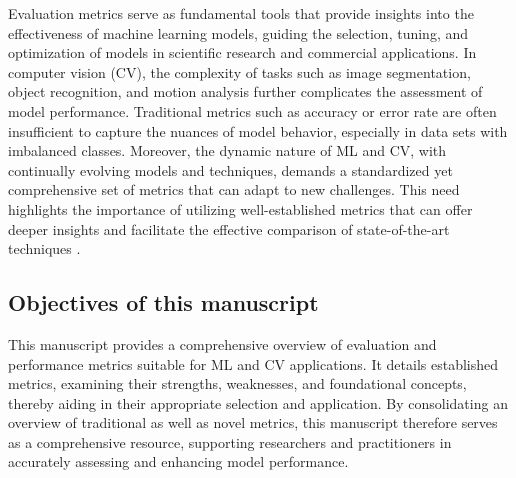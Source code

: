 \documentclass{article}
\begin{document}
Evaluation metrics serve as fundamental tools that provide insights into the effectiveness of machine learning models, guiding the selection, tuning, and optimization of models in scientific research and commercial applications. In computer vision (CV), the complexity of tasks such as image segmentation, object recognition, and motion analysis further complicates the assessment of model performance. Traditional metrics such as accuracy or error rate are often insufficient to capture the nuances of model behavior, especially in data sets with imbalanced classes. Moreover, the dynamic nature of ML and CV, with continually evolving models and techniques, demands a standardized yet comprehensive set of metrics that can adapt to new challenges. This need highlights the importance of utilizing well-established metrics that can offer deeper insights and facilitate the effective comparison of state-of-the-art techniques \cite{ferri2009experimental}.


\subsection{Objectives of this manuscript}

This manuscript provides a comprehensive overview of evaluation and performance metrics suitable for ML and CV applications. It details established metrics, examining their strengths, weaknesses, and foundational concepts, thereby aiding in their appropriate selection and application. By consolidating an overview of traditional as well as novel metrics, this manuscript therefore serves as a comprehensive resource, supporting researchers and practitioners in accurately assessing and enhancing model performance.




\clearpage





\newcommand{\listequationsname}{\Large List of Equations}
\newlistof{myequations}{equ}{\listequationsname}
\newcommand{\myequations}[1]{\addcontentsline{equ}{myequations}{\protect\numberline{\theequation}#1}\par}
\setlength{\cftmyequationsnumwidth}{2.5em}
\end{document}
